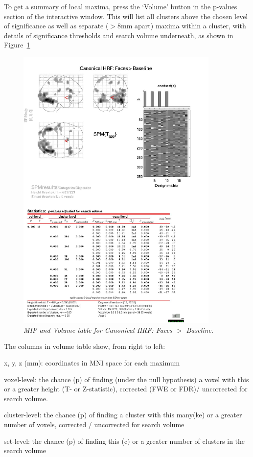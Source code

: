 To get a summary of local maxima, press the `Volume' button in the 
p-values section of the interactive window. This will list all clusters above the chosen level of significance as well as separate ($>$8mm apart) maxima within a cluster, with details of significance thresholds and search volume underneath, as shown in Figure~\ref{cat5_volume}
\begin{figure}
\begin{center}
\includegraphics[width=100mm]{faces/cat5_volume}
\caption{\em MIP and Volume table for Canonical HRF: Faces  $>$ Baseline. \label{cat5_volume} }
\end{center}
\end{figure}
The columns in volume table show, from right to left:
\bi
\item{x, y, z (mm): coordinates in MNI space for each maximum}
\item{voxel-level: the chance (p) of finding (under the null hypothesis) a voxel with this or a greater height (T- or Z-statistic), corrected (FWE or FDR)/ uncorrected for search volume.}
\item{cluster-level: the chance (p) of finding a cluster with this many(ke) or a greater number of voxels, corrected / uncorrected for search volume}
\item{set-level: the chance (p) of finding this (c) or a greater number of clusters in the search volume}
\ei

